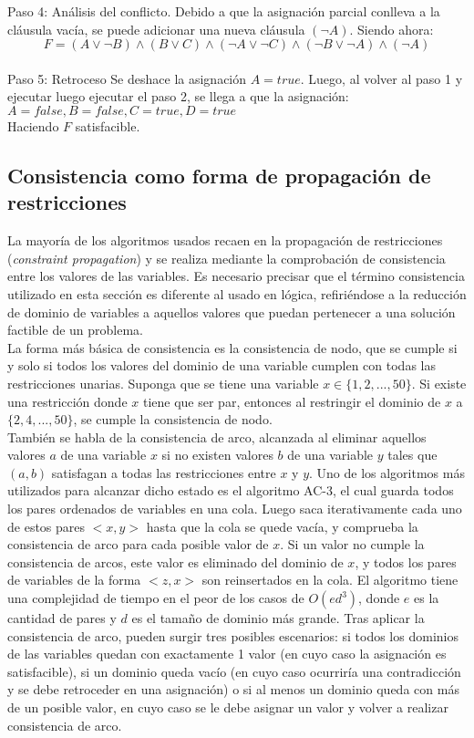\documentclass[12pt]{report}
\begin{document}
Paso 4: Análisis del conflicto.
Debido a que la asignación parcial conlleva a la cláusula vacía, se puede adicionar una nueva cláusula $(\neg A)$. Siendo ahora:
$$F=(A\lor \neg B)\land(B\lor C)\land(\neg A\lor \neg C)\land(\neg B\lor \neg A)\land(\neg A)$$\\

Paso 5: Retroceso
Se deshace la asignación $A=true$. Luego, al volver al paso 1 y ejecutar luego ejecutar el paso 2, se llega a que la asignación:
$A=false, B=false,C=true, D=true$\\

Haciendo $F$ satisfacible.

\subsection{Consistencia como forma de propagación de restricciones}

La mayoría de los algoritmos usados recaen en la propagación de restricciones (\textit{constraint propagation}) y se realiza mediante la comprobación de consistencia entre los valores de las variables. Es necesario precisar que el término consistencia utilizado en esta sección es diferente al usado en lógica, refiriéndose a la reducción de dominio de variables a aquellos valores que puedan pertenecer a una solución factible de un problema.\\

La forma más básica de consistencia es la consistencia de nodo, que se cumple si y solo si todos los valores del dominio de una variable cumplen con todas las restricciones unarias. Suponga que se tiene una variable $x \in \{1,2,...,50\}$. Si existe una restricción donde $x$ tiene que ser par, entonces al restringir el dominio de $x$ a $\{2,4,...,50\}$, se cumple la consistencia de nodo.\\

También se habla de la consistencia de arco, alcanzada al eliminar aquellos valores $a$ de una variable $x$ si no existen valores $b$ de una variable $y$ tales que $(a,b)$ satisfagan a todas las restricciones entre $x$ y $y$. Uno de los algoritmos más utilizados para alcanzar dicho estado es el algoritmo AC-3, el cual guarda todos los pares ordenados de variables en una cola. Luego saca iterativamente cada uno de estos pares $<x,y>$ hasta que la cola se quede vacía, y comprueba la consistencia de arco para cada posible valor de $x$. Si un valor no cumple la consistencia de arcos, este valor es eliminado del dominio de $x$, y todos los pares de variables de la forma $<z,x>$ son reinsertados en la cola. El algoritmo tiene una complejidad de tiempo en el peor de los casos de $O(ed^3 )$, donde $e$ es la cantidad de pares y $d$ es el tamaño de dominio más grande. Tras aplicar la consistencia de arco, pueden surgir tres posibles escenarios: si todos los dominios de las variables quedan con exactamente 1 valor (en cuyo caso la asignación es satisfacible), si un dominio queda vacío (en cuyo caso ocurriría una contradicción y se debe retroceder en una asignación) o si al menos un dominio queda con más de un posible valor, en cuyo caso se le debe asignar un valor y volver a realizar consistencia de arco.\\
\end{document}
